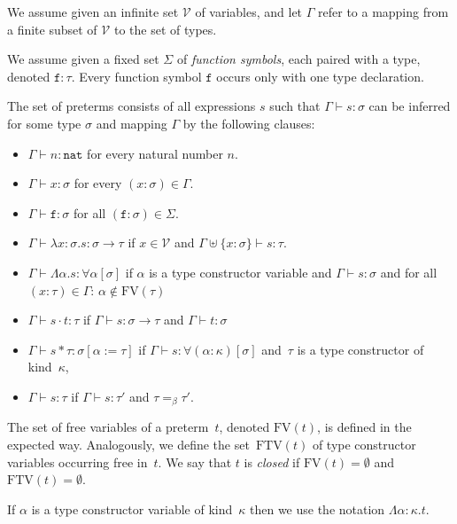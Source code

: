\documentclass[runningheads,a4paper]{llncs}
\newcommand{\Vars}{\mathcal{V}}
\newcommand{\quant}[2]{\forall #1[#2]}
\newcommand{\arrtype}{\rightarrow}
\newcommand{\abs}[2]{\lambda #1.#2}
\newcommand{\tabs}[2]{\Lambda #1.#2}
\newcommand{\app}[2]{#1 \cdot #2}
\newcommand{\tapp}[2]{#1 * #2}
\newcommand{\subst}[2]{#1:=#2}
\newcommand{\FTV}{\mathrm{FTV}}
\newcommand{\FV}{\mathrm{FV}}
\newcommand{\nat}{\mathtt{nat}}
\begin{document}
\begin{definition}\label{def_preterms}\normalfont
  We assume given an infinite set $\Vars$ of variables, and let
  $\Gamma$ refer to a mapping from a finite subset of $\Vars$ to the
  set of types.

  We assume given a fixed set $\Sigma$ of \emph{function symbols},
  each paired with a type, denoted $\mathtt{f} : \tau$.  Every
  function symbol $\mathtt{f}$ occurs only with one type declaration.

  The set of preterms consists of all expressions $s$ such that
  $\Gamma \vdash s : \sigma$ can be inferred for some type $\sigma$
  and mapping $\Gamma$ by the following clauses:
  \begin{itemize}
  \item $\Gamma \vdash n : \nat$ for every natural number $n$.
  \item $\Gamma \vdash x : \sigma$ for every $(x : \sigma) \in \Gamma$.
  \item $\Gamma \vdash \mathtt{f} : \sigma$ for all
    $(\mathtt{f} : \sigma) \in \Sigma$.
  \item $\Gamma \vdash \abs{x:\sigma}{s} : \sigma \arrtype \tau$ if $x
    \in \Vars$ and $\Gamma \uplus \{ x : \sigma \} \vdash s : \tau$.
  \item $\Gamma \vdash \tabs{\alpha}{s} : \quant{\alpha}{\sigma}$ if
    $\alpha$ is a type constructor variable and $\Gamma \vdash s :
    \sigma$ and for all $(x : \tau) \in \Gamma$: $\alpha \notin
    \FV(\tau)$
  \item $\Gamma \vdash \app{s}{t} : \tau$ if $\Gamma \vdash s : \sigma
    \arrtype \tau$ and $\Gamma \vdash t : \sigma$
  \item $\Gamma \vdash \tapp{s}{\tau} : \sigma[\subst{\alpha}{\tau}]$
    if $\Gamma \vdash s : \quant{(\alpha:\kappa)}{\sigma}$ and~$\tau$
    is a type constructor of kind~$\kappa$,
  \item $\Gamma \vdash s : \tau$ if $\Gamma \vdash s : \tau'$ and
    $\tau =_\beta \tau'$.
  \end{itemize}
  The set of free variables of a preterm~$t$, denoted $\FV(t)$, is
  defined in the expected way. Analogously, we define the
  set~$\FTV(t)$ of type constructor variables occurring free
  in~$t$. We say that $t$ is \emph{closed} if $\FV(t) = \emptyset$ and
  $\FTV(t) = \emptyset$.
\end{definition}

If $\alpha$ is a type constructor variable of kind~$\kappa$ then we
use the notation $\tabs{\alpha:\kappa}{t}$.
\end{document}
